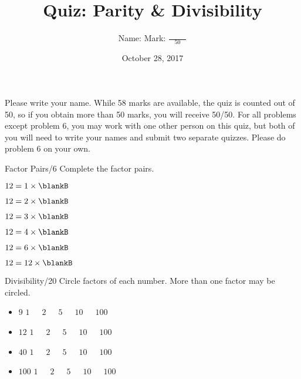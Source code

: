 \documentclass[12pt,letterpaper]{article}
\title{Quiz: Parity \& Divisibility}
\author{Name: \underline{\hspace{5cm}} Mark: $\displaystyle \frac{\hspace{3em}}{50}$}
\date{October 28, 2017}
\begin{document}
\maketitle

Please write your name. While 58 marks are available, the quiz is counted out of 50, so if
you obtain more than 50 marks, you will receive 50/50. For all problems except problem 6,
you may work with one other person on this quiz, but both of you will need to write your
names and submit two separate quizzes. Please do problem 6 on your own.

\thispagestyle{empty}

\begin{problem}{Factor Pairs\hfill/6}
 Complete the factor pairs.

 \begin{itemize}
  \begin{multicols}{2}
   \item $12 = 1 \times \blankB$
   \item $12 = 2 \times \blankB$
   \item $12 = 3 \times \blankB$
   \item $12 = 4 \times \blankB$
   \item $12 = 6 \times \blankB$
   \item $12 = 12 \times \blankB$
  \end{multicols}
 \end{itemize}

\end{problem}

\begin{problem}{Divisibility\hfill/20}
 Circle factors of each number. More than one factor may be circled.

 \begin{itemize}
  \item $9$ \hfill $1$~~~$2$~~~$5$~~~$10$~~~$100$
  \item $12$ \hfill $1$~~~$2$~~~$5$~~~$10$~~~$100$
  \item $40$ \hfill $1$~~~$2$~~~$5$~~~$10$~~~$100$
  \item $100$ \hfill $1$~~~$2$~~~$5$~~~$10$~~~$100$
 \end{itemize}
\end{problem}
\end{document}

